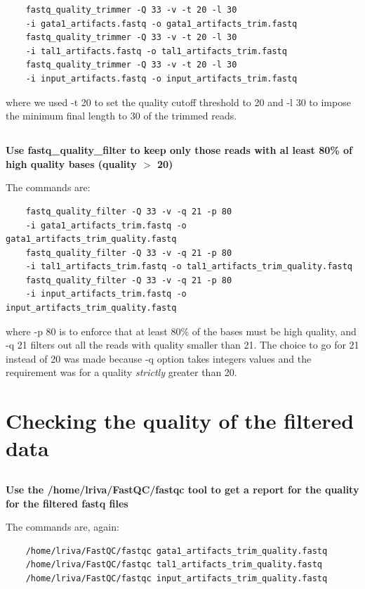 \documentclass[12pt, a4paper]{article}
\begin{document}
	\begin{verbatim}
	fastq_quality_trimmer -Q 33 -v -t 20 -l 30
	-i gata1_artifacts.fastq -o gata1_artifacts_trim.fastq
	fastq_quality_trimmer -Q 33 -v -t 20 -l 30
	-i tal1_artifacts.fastq -o tal1_artifacts_trim.fastq
	fastq_quality_trimmer -Q 33 -v -t 20 -l 30
	-i input_artifacts.fastq -o input_artifacts_trim.fastq	
	\end{verbatim}
	
	where we used -t 20 to set the quality cutoff threshold to 20 and -l 30 to impose the minimum final length to 30 of the trimmed reads.
	
	\subsection{}
	\textbf{Use fastq\_quality\_filter to keep only those reads with al least 80\% of high quality bases (quality $>$ 20)}
	
	The commands are:
	
	\begin{verbatim}
	fastq_quality_filter -Q 33 -v -q 21 -p 80
	-i gata1_artifacts_trim.fastq -o gata1_artifacts_trim_quality.fastq
	fastq_quality_filter -Q 33 -v -q 21 -p 80
	-i tal1_artifacts_trim.fastq -o tal1_artifacts_trim_quality.fastq
	fastq_quality_filter -Q 33 -v -q 21 -p 80
	-i input_artifacts_trim.fastq -o input_artifacts_trim_quality.fastq
	\end{verbatim}
	
	where -p 80 is to enforce that at least 80\% of the bases must be high quality, and -q 21 filters out all the reads with quality smaller than 21. The choice to go for 21 instead of 20 was made because -q option takes integers values and the requirement was for a quality \textit{strictly} greater than 20.
	
	\section{Checking the quality of the filtered data}
	
	\subsection{}
	\textbf{Use the /home/lriva/FastQC/fastqc tool to get a report for the quality for the filtered fastq files}
	
	The commands are, again:
	
	\begin{verbatim}
	/home/lriva/FastQC/fastqc gata1_artifacts_trim_quality.fastq
	/home/lriva/FastQC/fastqc tal1_artifacts_trim_quality.fastq
	/home/lriva/FastQC/fastqc input_artifacts_trim_quality.fastq
	\end{verbatim}
	
\end{document}
